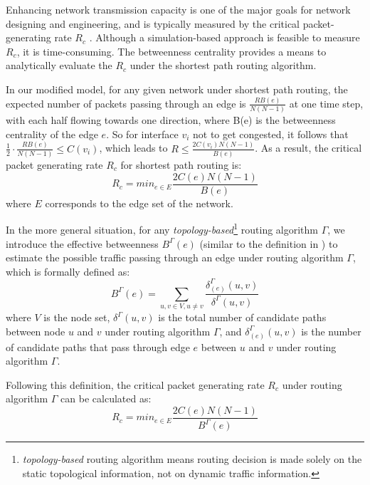 \documentclass[journal]{IEEEtran}
\begin{document}
{Enhancing network transmission capacity is one of the major goals
for network designing and engineering, and is typically measured by
the critical packet-generating rate $R_c$ \cite{efficient-routing,
edge-deletion, onset-traffic-congestion,Danila06}. Although a
simulation-based approach is feasible to measure $R_c$, it is
time-consuming. The betweenness centrality provides a means to
analytically evaluate the $R_c$ under the shortest path routing
algorithm.

In our modified model, for any given network under shortest path
routing, the expected number of packets passing through an edge is
$\frac{RB(e)}{N(N-1)}$ at one time step, with each half flowing
towards one direction, where B(e) is the betweenness centrality of
the edge $e$. So for interface $v_i$ not to get congested, it
follows that $\frac{1}{2}\cdot\frac{RB(e)}{N(N-1)}\leq C(v_i)$,
which leads to $R\leq \frac{2C(v_i)N(N-1)}{B(e)}$. As a result, the
critical packet generating rate $R_c$ for shortest path routing is:
\begin{equation}
\label{rc_theory_equation} R_c=min_{e\in E}\frac{2C(e)N(N-1)}{B(e)}
\end{equation}
where $E$ corresponds to the edge set of the network.

In the more general situation, for any
\emph{topology-based}\footnote{\emph{topology-based} routing
algorithm means routing decision is made solely on the static
topological information, not on dynamic traffic information.}
routing algorithm $\Gamma$, we introduce the effective betweenness
$B^{\Gamma}(e)$ (similar to the definition in
\cite{efficient-routing}) to estimate the possible traffic passing
through an edge under routing algorithm $\Gamma$, which is formally
defined as:
\begin{equation*}
B^{\Gamma}(e)=\sum_{u, v\in V, u\neq
v}\frac{\delta^{\Gamma}_{(e)}(u,v)}{\delta^{\Gamma}(u,v)}
\end{equation*}
where $V$ is the node set, $\delta^{\Gamma}(u,v)$ is the total
number of candidate paths between node $u$ and $v$ under routing
algorithm $\Gamma$, and $\delta^{\Gamma}_{(e)}(u,v)$ is the number
of candidate paths that pass through edge $e$ between $u$ and $v$
under routing algorithm $\Gamma$.

Following this definition, the critical packet generating rate $R_c$
under routing algorithm $\Gamma$ can be calculated as:
\begin{equation}\label{fomular}
R_c=min_{e\in E} \frac{2C(e)N(N-1)}{B^{\Gamma}(e)}
\end{equation}

}
\end{document}

